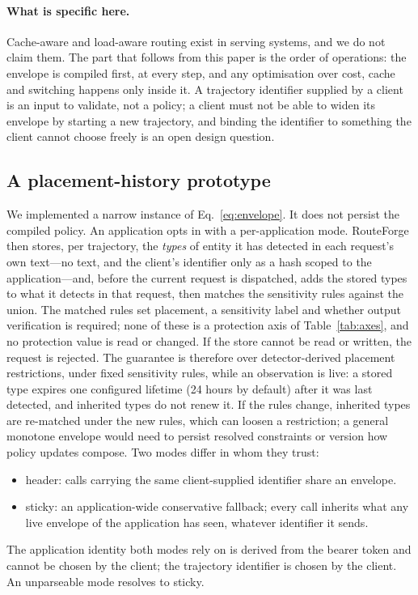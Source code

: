 \documentclass[11pt]{article}
\newcommand{\ubreak}{\textunderscore\allowbreak}
\newcommand{\code}[1]{{\ttfamily\let\_\ubreak #1}}
\begin{document}
\paragraph{What is specific here.} Cache-aware and load-aware routing exist in serving systems,
and we do not claim them. The part that follows from this paper is the order of operations: the
envelope is compiled first, at every step, and any optimisation over cost, cache and switching
happens only inside it. A trajectory identifier supplied by a client is an input to validate,
not a policy; a client must not be able to widen its envelope by starting a new trajectory, and
binding the identifier to something the client cannot choose freely is an open design question.

\subsection{A placement-history prototype}
\label{sec:envelope}

We implemented a narrow instance of Eq.~\eqref{eq:envelope}. It does not persist the compiled
policy. An application opts in with a per-application mode. RouteForge then stores, per
trajectory, the \emph{types} of entity it has detected in each request's own text---no text,
and the client's identifier only as a hash scoped to the application---and, before the current
request is dispatched, adds the stored types to what it detects in that request, then matches
the sensitivity rules against the union. The matched rules set placement, a sensitivity label
and whether output verification is required; none of these is a protection axis of
Table~\ref{tab:axes}, and no protection value is read or changed. If the store cannot be read or
written, the request is rejected. The guarantee is therefore over detector-derived placement
restrictions, under fixed sensitivity rules, while an observation is live: a stored type expires
one configured lifetime (24 hours by default) after it was last detected, and inherited types do
not renew it. If the rules change, inherited types are re-matched under the new rules, which can
loosen a restriction; a general monotone envelope would need to persist resolved constraints or
version how policy updates compose. Two modes differ in whom they trust:
\begin{itemize}
  \item \code{header}: calls carrying the same client-supplied identifier share an envelope.
  \item \code{sticky}: an application-wide conservative fallback; every call inherits what any
    live envelope of the application has seen, whatever identifier it sends.
\end{itemize}
The application identity both modes rely on is derived from the bearer token and cannot be
chosen by the client; the trajectory identifier is chosen by the client. An unparseable mode
resolves to \code{sticky}.
\end{document}
